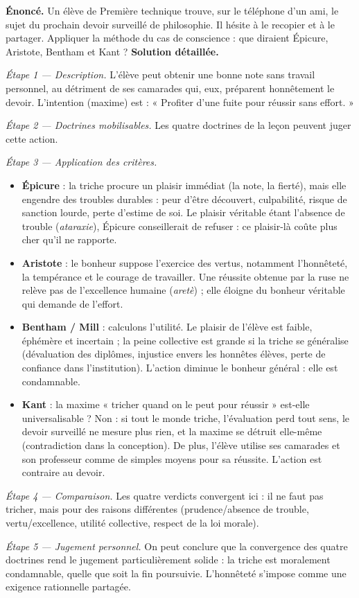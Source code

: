 \documentclass[11pt]{article}
\begin{document}
\begin{exoresolu}
\textbf{Énoncé.} Un élève de Première technique trouve, sur le téléphone d'un ami, le sujet du prochain devoir surveillé de philosophie. Il hésite à le recopier et à le partager. Appliquer la méthode du cas de conscience : que diraient Épicure, Aristote, Bentham et Kant ?
\tcblower
\textbf{Solution détaillée.}

\emph{Étape 1 — Description.} L'élève peut obtenir une bonne note sans travail personnel, au détriment de ses camarades qui, eux, préparent honnêtement le devoir. L'intention (maxime) est : « Profiter d'une fuite pour réussir sans effort. »

\emph{Étape 2 — Doctrines mobilisables.} Les quatre doctrines de la leçon peuvent juger cette action.

\emph{Étape 3 — Application des critères.}
\begin{itemize}
\item \textbf{Épicure} : la triche procure un plaisir immédiat (la note, la fierté), mais elle engendre des troubles durables : peur d'être découvert, culpabilité, risque de sanction lourde, perte d'estime de soi. Le plaisir véritable étant l'absence de trouble (\emph{ataraxie}), Épicure conseillerait de refuser : ce plaisir-là coûte plus cher qu'il ne rapporte.
\item \textbf{Aristote} : le bonheur suppose l'exercice des vertus, notamment l'honnêteté, la tempérance et le courage de travailler. Une réussite obtenue par la ruse ne relève pas de l'excellence humaine (\emph{aretè}) ; elle éloigne du bonheur véritable qui demande de l'effort.
\item \textbf{Bentham / Mill} : calculons l'utilité. Le plaisir de l'élève est faible, éphémère et incertain ; la peine collective est grande si la triche se généralise (dévaluation des diplômes, injustice envers les honnêtes élèves, perte de confiance dans l'institution). L'action diminue le bonheur général : elle est condamnable.
\item \textbf{Kant} : la maxime « tricher quand on le peut pour réussir » est-elle universalisable ? Non : si tout le monde triche, l'évaluation perd tout sens, le devoir surveillé ne mesure plus rien, et la maxime se détruit elle-même (contradiction dans la conception). De plus, l'élève utilise ses camarades et son professeur comme de simples moyens pour sa réussite. L'action est contraire au devoir.
\end{itemize}

\emph{Étape 4 — Comparaison.} Les quatre verdicts convergent ici : il ne faut pas tricher, mais pour des raisons différentes (prudence/absence de trouble, vertu/excellence, utilité collective, respect de la loi morale).

\emph{Étape 5 — Jugement personnel.} On peut conclure que la convergence des quatre doctrines rend le jugement particulièrement solide : la triche est moralement condamnable, quelle que soit la fin poursuivie. L'honnêteté s'impose comme une exigence rationnelle partagée.
\end{exoresolu}
\end{document}
